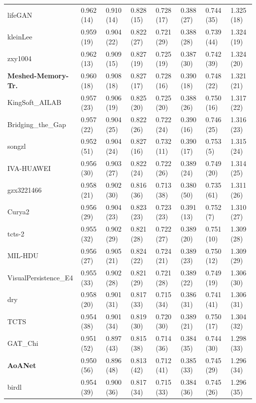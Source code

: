 \documentclass[english,twoside,openright]{HYgraduMLDS}
\begin{document}
\begin{appendices}
\begin{longtable}{l|l|l|l|l|l|l|l}
lifeGAN & 0.962 (14) & 0.910 (14) & 0.828 (15) & 0.728 (17) & 0.388 (27) & 0.744 (35) & 1.325 (18) \\
kleinLee & 0.959 (19) & 0.904 (22) & 0.822 (27) & 0.721 (29) & 0.388 (28) & 0.739 (44) & 1.324 (19) \\
zxy1004 & 0.962 (13) & 0.909 (15) & 0.827 (19) & 0.725 (19) & 0.387 (30) & 0.742 (39) & 1.324 (20) \\
\textbf{Meshed-Memory-Tr.} & 0.960 (18) & 0.908 (18) & 0.827 (17) & 0.728 (16) & 0.390 (18) & 0.748 (22) & 1.321 (21) \\
KingSoft\_AILAB & 0.957 (23) & 0.906 (19) & 0.825 (20) & 0.725 (20) & 0.388 (26) & 0.750 (16) & 1.317 (22) \\
Bridging\_the\_Gap & 0.957 (22) & 0.904 (25) & 0.822 (26) & 0.722 (24) & 0.390 (16) & 0.746 (25) & 1.316 (23) \\
songzl & 0.952 (51) & 0.904 (24) & 0.827 (16) & 0.732 (11) & 0.390 (17) & 0.753 (5) & 1.315 (24) \\
IVA-HUAWEI & 0.956 (30) & 0.903 (27) & 0.822 (24) & 0.722 (26) & 0.389 (24) & 0.749 (20) & 1.314 (25) \\
gzx3221466 & 0.958 (21) & 0.902 (30) & 0.816 (36) & 0.713 (38) & 0.380 (50) & 0.735 (61) & 1.311 (26) \\
Curya2 & 0.956 (29) & 0.904 (23) & 0.823 (23) & 0.723 (23) & 0.391 (13) & 0.752 (7) & 1.310 (27) \\
tcts-2 & 0.955 (32) & 0.902 (29) & 0.821 (28) & 0.722 (27) & 0.389 (20) & 0.751 (10) & 1.309 (28) \\
MIL-HDU & 0.956 (27) & 0.905 (21) & 0.824 (22) & 0.724 (21) & 0.389 (23) & 0.750 (12) & 1.309 (29) \\
VisualPersistence\_E4 & 0.955 (33) & 0.902 (28) & 0.821 (29) & 0.721 (28) & 0.389 (22) & 0.749 (19) & 1.306 (30) \\
dry & 0.958 (20) & 0.901 (31) & 0.817 (33) & 0.715 (34) & 0.386 (31) & 0.741 (41) & 1.306 (31) \\
TCTS & 0.954 (38) & 0.901 (34) & 0.819 (30) & 0.720 (30) & 0.389 (21) & 0.750 (17) & 1.304 (32) \\
GAT\_Chi & 0.951 (52) & 0.897 (43) & 0.815 (38) & 0.714 (36) & 0.384 (35) & 0.744 (30) & 1.298 (33) \\
\textbf{AoANet} & 0.950 (56) & 0.896 (48) & 0.813 (42) & 0.712 (41) & 0.385 (33) & 0.745 (29) & 1.296 (34) \\
birdl & 0.954 (39) & 0.900 (36) & 0.817 (34) & 0.715 (33) & 0.384 (36) & 0.745 (26) & 1.296 (35) \\

\end{longtable}
\end{appendices}
\end{document}

